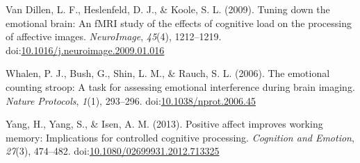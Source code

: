 \documentclass[man]{apa6}
\begin{document}
\leavevmode\hypertarget{ref-van_dillen_tuning_2009}{}%
Van Dillen, L. F., Heslenfeld, D. J., \& Koole, S. L. (2009). Tuning down the emotional brain: An fMRI study of the effects of cognitive load on the processing of affective images. \emph{NeuroImage}, \emph{45}(4), 1212--1219. doi:\href{https://doi.org/10.1016/j.neuroimage.2009.01.016}{10.1016/j.neuroimage.2009.01.016}

\leavevmode\hypertarget{ref-whalen_emotional_2006}{}%
Whalen, P. J., Bush, G., Shin, L. M., \& Rauch, S. L. (2006). The emotional counting stroop: A task for assessing emotional interference during brain imaging. \emph{Nature Protocols}, \emph{1}(1), 293--296. doi:\href{https://doi.org/10.1038/nprot.2006.45}{10.1038/nprot.2006.45}

\leavevmode\hypertarget{ref-yang_positive_2013}{}%
Yang, H., Yang, S., \& Isen, A. M. (2013). Positive affect improves working memory: Implications for controlled cognitive processing. \emph{Cognition and Emotion}, \emph{27}(3), 474--482. doi:\href{https://doi.org/10.1080/02699931.2012.713325}{10.1080/02699931.2012.713325}

\endgroup
\end{document}

